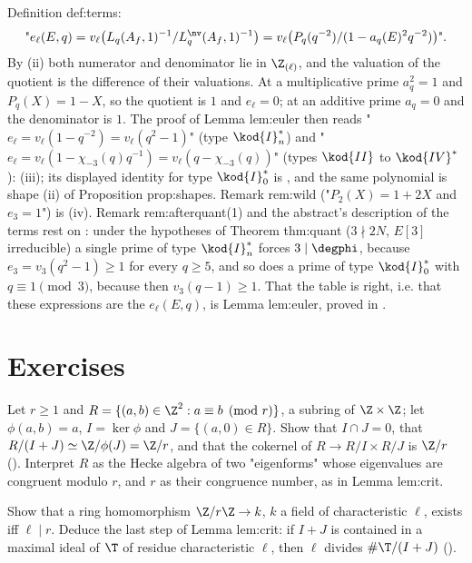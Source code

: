 \begin{paperlink}\label{pl:rings:terms}
Definition def:terms:
\[
\text{"}e_\ell(E,q)=v_\ell\bigl(L_q(A_f,1)^{-1}/L_q^{\nv}(A_f,1)^{-1}\bigr)=v_\ell\bigl(P_q(q^{-2})/(1-a_q(E)^2q^{-2})\bigr)\text{".}
\]
By (ii)
both numerator and denominator lie in $\Z_{(\ell)}$, and the valuation of the quotient is the difference of their valuations. At a multiplicative prime
$a_q^2=1$ and $P_q(X)=1-X$, so the quotient is $1$ and $e_\ell=0$; at an additive prime $a_q=0$ and the denominator is $1$. The proof of Lemma
lem:euler then reads "$e_\ell=v_\ell(1-q^{-2})=v_\ell(q^2-1)$" (type $\kod{I}_n^*$) and "$e_\ell=v_\ell(1-\chi_{-3}(q)q^{-1})=v_\ell(q-\chi_{-3}(q))$" (types $\kod{II}$ to
$\kod{IV}^*$): (iii); its displayed identity for type $\kod{I}_0^*$ is , and the same polynomial
is shape (ii) of Proposition prop:shapes. Remark rem:wild ("$P_2(X)=1+2X$ and $e_3=1$") is (iv). Remark
rem:afterquant(1) and the abstract's description of the terms rest on : under the hypotheses of Theorem thm:quant
($3\nmid2N$, $E[3]$ irreducible) a single prime of type $\kod{I}_n^*$ forces $3\mid\degphi$, because $e_3=v_3(q^2-1)\ge1$ for every $q\ge5$, and so does a prime of
type $\kod{I}_0^*$ with $q\equiv1\pmod3$, because then $v_3(q-1)\ge1$. That the table is right, i.e. that these
expressions are the $e_\ell(E,q)$, is Lemma lem:euler, proved in .
\end{paperlink}

\section{Exercises}\label{sec:rings:exercises}

\begin{exercise}\label{ex:rings:toy-hecke}
Let $r\ge1$ and $R=\{(a,b)\in\Z^2:a\equiv b\pmod r\}$, a subring of $\Z\times\Z$; let $\phi(a,b)=a$, $I=\ker\phi$ and $J=\{(a,0)\in R\}$. Show that $I\cap J=0$, that
$R/(I+J)\simeq\Z/\phi(J)=\Z/r$, and that the cokernel of $R\to R/I\times R/J$ is $\Z/r$ (). Interpret $R$ as the
Hecke algebra of two "eigenforms" whose eigenvalues are congruent modulo $r$, and $r$ as their congruence number, as in Lemma lem:crit.
\end{exercise}

\begin{exercise}\label{ex:rings:residue}
Show that a ring homomorphism $\Z/r\Z\to k$, $k$ a field of characteristic $\ell$, exists iff $\ell\mid r$. Deduce the last step of Lemma lem:crit: if
$I+J$ is contained in a maximal ideal of $\T$ of residue characteristic $\ell$, then $\ell$ divides $\#\T/(I+J)$ ().
\end{exercise}

